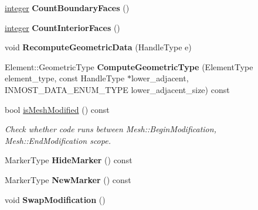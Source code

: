 \begin{DoxyCompactItemize}
\item 
\hypertarget{classINMOST_1_1Mesh_a28fac7af473402381cb2b967f4ae057c}{\hyperlink{classINMOST_1_1Storage_aec96942bc647417a801e2895b45964d2}{integer} {\bfseries Count\-Boundary\-Faces} ()}\label{classINMOST_1_1Mesh_a28fac7af473402381cb2b967f4ae057c}

\item 
\hypertarget{classINMOST_1_1Mesh_af89ada8254d449794ab4f55815963ecb}{\hyperlink{classINMOST_1_1Storage_aec96942bc647417a801e2895b45964d2}{integer} {\bfseries Count\-Interior\-Faces} ()}\label{classINMOST_1_1Mesh_af89ada8254d449794ab4f55815963ecb}

\item 
\hypertarget{classINMOST_1_1Mesh_a1263ae4c38b01550f28ee6f502d75246}{void {\bfseries Recompute\-Geometric\-Data} (Handle\-Type e)}\label{classINMOST_1_1Mesh_a1263ae4c38b01550f28ee6f502d75246}

\item 
\hypertarget{classINMOST_1_1Mesh_a3e7891840e8ed563be5b88da0f8b7f95}{Element\-::\-Geometric\-Type {\bfseries Compute\-Geometric\-Type} (Element\-Type element\-\_\-type, const Handle\-Type $\ast$lower\-\_\-adjacent, I\-N\-M\-O\-S\-T\-\_\-\-D\-A\-T\-A\-\_\-\-E\-N\-U\-M\-\_\-\-T\-Y\-P\-E lower\-\_\-adjacent\-\_\-size) const }\label{classINMOST_1_1Mesh_a3e7891840e8ed563be5b88da0f8b7f95}

\item 
bool \hyperlink{classINMOST_1_1Mesh_a870a18031c98f36972e6df4c21859a28}{is\-Mesh\-Modified} () const 
\begin{DoxyCompactList}\small\item\em Check whether code runs between Mesh\-::\-Begin\-Modification, Mesh\-::\-End\-Modification scope. \end{DoxyCompactList}\item 
\hypertarget{classINMOST_1_1Mesh_ad113bb7fdc195cda837274fd9cdda4a2}{Marker\-Type {\bfseries Hide\-Marker} () const }\label{classINMOST_1_1Mesh_ad113bb7fdc195cda837274fd9cdda4a2}

\item 
\hypertarget{classINMOST_1_1Mesh_a0456acc039a3199e0d7e38d6d1a72400}{Marker\-Type {\bfseries New\-Marker} () const }\label{classINMOST_1_1Mesh_a0456acc039a3199e0d7e38d6d1a72400}

\item 
\hypertarget{classINMOST_1_1Mesh_ac0175d8aad4ca37cdf5ad67627204ded}{void {\bfseries Swap\-Modification} ()}\label{classINMOST_1_1Mesh_ac0175d8aad4ca37cdf5ad67627204ded}


\end{DoxyCompactItemize}
